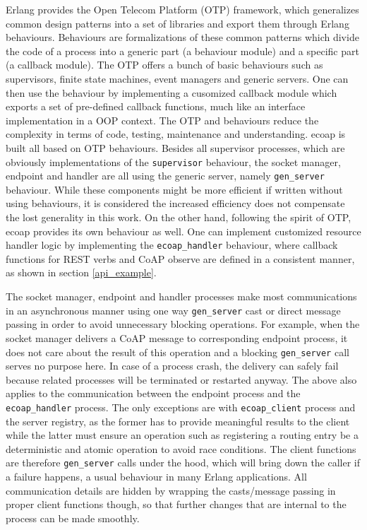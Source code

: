 Erlang provides the Open Telecom Platform (OTP) framework, which generalizes common design patterns into a set of libraries and export them through Erlang behaviours. Behaviours are formalizations of these common patterns which divide the code of a process into a generic part (a behaviour module) and a specific part (a callback module). The OTP offers a bunch of basic behaviours such as supervisors, finite state machines, event managers and generic servers. One can then use the behaviour by implementing a cusomized callback module which exports a set of pre-defined callback functions, much like an interface implementation in a OOP context. The OTP and behaviours reduce the complexity in terms of code, testing, maintenance and understanding. ecoap is built all based on OTP behaviours. Besides all supervisor processes, which are obviously implementations of the \verb|supervisor| behaviour, the socket manager, endpoint and handler are all using the generic server, namely \verb|gen_server| behaviour. While these components might be more efficient if written without using behaviours, it is considered the increased efficiency does not compensate the lost generality in this work. On the other hand, following the spirit of OTP, ecoap provides its own behaviour as well. One can implement customized resource handler logic by implementing the \verb|ecoap_handler| behaviour, where callback functions for REST verbs and CoAP observe are defined in a consistent manner, as shown in section \ref{api_example}.

The socket manager, endpoint and handler processes make most communications in an asynchronous manner using one way \verb|gen_server| cast or direct message passing in order to avoid unnecessary blocking operations. For example, when the socket manager delivers a CoAP message to corresponding endpoint process, it does not care about the result of this operation and a blocking \verb|gen_server| call serves no purpose here. In case of a process crash, the delivery can safely fail because related processes will be terminated or restarted anyway. The above also applies to the communication between the endpoint process and the \verb|ecoap_handler| process. The only exceptions are with \verb|ecoap_client| process and the server registry, as the former has to provide meaningful results to the client while the latter must ensure an operation such as registering a routing entry be a deterministic and atomic operation to avoid race conditions. The client functions are therefore \verb|gen_server| calls under the hood, which will bring down the caller if a failure happens, a usual behaviour in many Erlang applications. All communication details are hidden by wrapping the casts/message passing in proper client functions though, so that further changes that are internal to the process can be made smoothly. 

